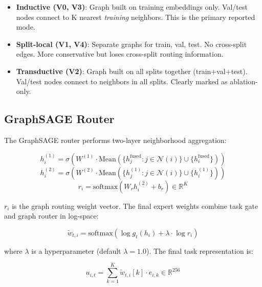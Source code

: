 \documentclass[12pt,oneside]{book}
\begin{document}
\begin{itemize}
    \item \textbf{Inductive (V0, V3)}: Graph built on training embeddings only. Val/test nodes connect to K nearest \emph{training} neighbors. This is the primary reported mode.
    \item \textbf{Split-local (V1, V4)}: Separate graphs for train, val, test. No cross-split edges. More conservative but loses cross-split routing information.
    \item \textbf{Transductive (V2)}: Graph built on all splits together (train+val+test). Val/test nodes connect to neighbors in all splits. Clearly marked as ablation-only.
\end{itemize}



\subsection{GraphSAGE Router}

The GraphSAGE router performs two-layer neighborhood aggregation:

\begin{equation}
    h_i^{(1)} = \sigma(W^{(1)} \cdot \text{Mean}(\{h_j^{\text{fused}} : j \in \mathcal{N}(i)\} \cup \{h_i^{\text{fused}}\}))
\end{equation}
\begin{equation}
    h_i^{(2)} = \sigma(W^{(2)} \cdot \text{Mean}(\{h_j^{(1)} : j \in \mathcal{N}(i)\} \cup \{h_i^{(1)}\}))
\end{equation}
\begin{equation}
    r_i = \text{softmax}(W_r h_i^{(2)} + b_r) \in \mathbb{R}^K
\end{equation}

$r_i$ is the graph routing weight vector. The final expert weights combine task gate and graph router in log-space:

\begin{equation}
    \tilde{w}_{t,i} = \text{softmax}(\log g_t(h_i) + \lambda \cdot \log r_i)
\end{equation}

where $\lambda$ is a hyperparameter (default $\lambda=1.0$). The final task representation is:

\begin{equation}
    u_{i,t} = \sum_{k=1}^K \tilde{w}_{t,i}[k] \cdot e_{i,k} \in \mathbb{R}^{256}
\end{equation}
\end{document}
